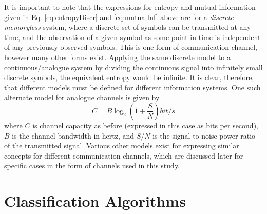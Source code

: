 \par
It is important to note that the expressions for entropy and mutual information given in Eq. \ref{eq:entropyDiscr} and \ref{eq:mutualInf} above are for a \emph{discrete memoryless} system, where a discrete set of symbols can be transmitted at any time, and the observation of a given symbol as some point in time is independent of any previously observed symbols. This is one form of communication channel, however many other forms exist. Applying the same discrete model to a continuous/analogue system by dividing the continuous signal into infinitely small discrete symbols, the equivalent entropy would be infinite. It is clear, therefore, that different models must be defined for different information systems. One such alternate model for analogue channels is given by
\begin{equation}
    \label{eq:chanCapAnalogue}
    C = B\log_{2}\left(1 + \frac{S}{N}\right) bit/s
\end{equation}
where $C$ is channel capacity as before (expressed in this case as bits per second), $B$ is the channel bandwidth in hertz, and $S/N$ is the signal-to-noise power ratio of the transmitted signal. Various other models exist for expressing similar concepts for different communication channels, which are discussed later for specific cases in the form of channels used in this study.

\section{Classification Algorithms}
\label{chap:back:class}

